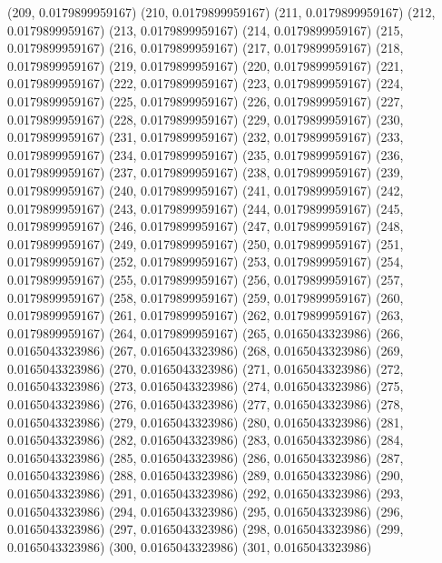 {					(209, 0.0179899959167)
					(210, 0.0179899959167)
					(211, 0.0179899959167)
					(212, 0.0179899959167)
					(213, 0.0179899959167)
					(214, 0.0179899959167)
					(215, 0.0179899959167)
					(216, 0.0179899959167)
					(217, 0.0179899959167)
					(218, 0.0179899959167)
					(219, 0.0179899959167)
					(220, 0.0179899959167)
					(221, 0.0179899959167)
					(222, 0.0179899959167)
					(223, 0.0179899959167)
					(224, 0.0179899959167)
					(225, 0.0179899959167)
					(226, 0.0179899959167)
					(227, 0.0179899959167)
					(228, 0.0179899959167)
					(229, 0.0179899959167)
					(230, 0.0179899959167)
					(231, 0.0179899959167)
					(232, 0.0179899959167)
					(233, 0.0179899959167)
					(234, 0.0179899959167)
					(235, 0.0179899959167)
					(236, 0.0179899959167)
					(237, 0.0179899959167)
					(238, 0.0179899959167)
					(239, 0.0179899959167)
					(240, 0.0179899959167)
					(241, 0.0179899959167)
					(242, 0.0179899959167)
					(243, 0.0179899959167)
					(244, 0.0179899959167)
					(245, 0.0179899959167)
					(246, 0.0179899959167)
					(247, 0.0179899959167)
					(248, 0.0179899959167)
					(249, 0.0179899959167)
					(250, 0.0179899959167)
					(251, 0.0179899959167)
					(252, 0.0179899959167)
					(253, 0.0179899959167)
					(254, 0.0179899959167)
					(255, 0.0179899959167)
					(256, 0.0179899959167)
					(257, 0.0179899959167)
					(258, 0.0179899959167)
					(259, 0.0179899959167)
					(260, 0.0179899959167)
					(261, 0.0179899959167)
					(262, 0.0179899959167)
					(263, 0.0179899959167)
					(264, 0.0179899959167)
					(265, 0.0165043323986)
					(266, 0.0165043323986)
					(267, 0.0165043323986)
					(268, 0.0165043323986)
					(269, 0.0165043323986)
					(270, 0.0165043323986)
					(271, 0.0165043323986)
					(272, 0.0165043323986)
					(273, 0.0165043323986)
					(274, 0.0165043323986)
					(275, 0.0165043323986)
					(276, 0.0165043323986)
					(277, 0.0165043323986)
					(278, 0.0165043323986)
					(279, 0.0165043323986)
					(280, 0.0165043323986)
					(281, 0.0165043323986)
					(282, 0.0165043323986)
					(283, 0.0165043323986)
					(284, 0.0165043323986)
					(285, 0.0165043323986)
					(286, 0.0165043323986)
					(287, 0.0165043323986)
					(288, 0.0165043323986)
					(289, 0.0165043323986)
					(290, 0.0165043323986)
					(291, 0.0165043323986)
					(292, 0.0165043323986)
					(293, 0.0165043323986)
					(294, 0.0165043323986)
					(295, 0.0165043323986)
					(296, 0.0165043323986)
					(297, 0.0165043323986)
					(298, 0.0165043323986)
					(299, 0.0165043323986)
					(300, 0.0165043323986)
					(301, 0.0165043323986)
}
